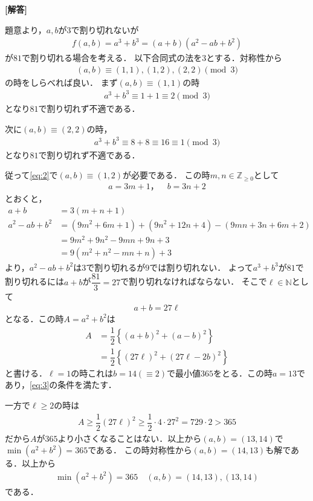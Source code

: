 \documentclass[../../main.tex]{subfiles}
\begin{document}
\begin{oframed}
  
\end{oframed}

{\bf [解答]}

題意より，$a,b$が$3$で割り切れないが
\begin{align}
  f(a,b) = a^3+b^3=(a+b)(a^2-ab+b^2) \label{eq:1}
\end{align}
が$81$で割り切れる場合を考える．
以下合同式の法を$3$とする．対称性から
\begin{align}
  (a,b)\equiv(1,1),(1,2),(2,2) \pmod{3} \label{eq:2}
\end{align}
の時をしらべれば良い．
まず$(a,b)\equiv(1,1)$の時
\begin{align}
  a^3 + b^3 \equiv 1+1 \equiv 2 \pmod 3
\end{align}
となり$81$で割り切れず不適である．

次に$(a,b)\equiv(2,2)$の時，
\begin{align}
  a^3+b^3 \equiv 8+8 \equiv 16 \equiv1 \pmod 3
\end{align}
となり$81$で割り切れず不適である．

従って\cref{eq:2}で$(a,b)\equiv(1,2)$が必要である．
この時$m,n\in\mathbb{Z}_{\ge0}$として
\begin{align}
  a=3m+1，\quad b=3n+2 \label{eq:3}
\end{align}
とおくと，
\begin{align}
  a+b
  & =3(m+n+1) \\
  a^2-ab+b^2
  & =(9m^2+6m+1)+(9n^2+12n+4)-(9mn+3n+6m+2) \\
  & =9m^2+9n^2-9mn+9n+3 \\
  & =9(m^2+n^2-mn+n)+3
\end{align}
より，$a^2-ab+b^2$は$3$で割り切れるが$9$では割り切れない．
よって$a^3+b^3$が$81$で割り切れるには$a+b$が$\dfrac{81}{3}=27$で割り切れなければならない．
そこで$\ell\in\mathbb{N}$として
\begin{align}
  a+b=27\ell \label{eq:4}
\end{align}
となる．この時$A=a^2+b^2$は
\begin{align}
  A
  &=\dfrac{1}{2}\left\{(a+b)^2+(a-b)^2\right\}\\
  &=\dfrac{1}{2}\left\{(27\ell)^2+(27\ell-2b)^2\right\}
\end{align}
と書ける．$\ell=1$の時これは$b=14(\equiv2)$で最小値$365$をとる．この時$a=13$であり，\cref{eq:3}の条件を満たす．

一方で$\ell\ge2$の時は
\begin{align}
  A\ge\dfrac{1}{2}(27\ell)^2\ge\dfrac{1}{2}\cdot4\cdot27^2=729\cdot2>365
\end{align}
だから$A$が$365$より小さくなることはない．以上から$(a,b)=(13,14)$で$\min(a^2+b^2)=365$である．
この時対称性から$(a,b)=(14,13)$も解である．以上から
\begin{align}
  \min (a^2+b^2) = 365 \quad (a,b)=(14,13),(13,14)
\end{align}
である．
\end{document}
